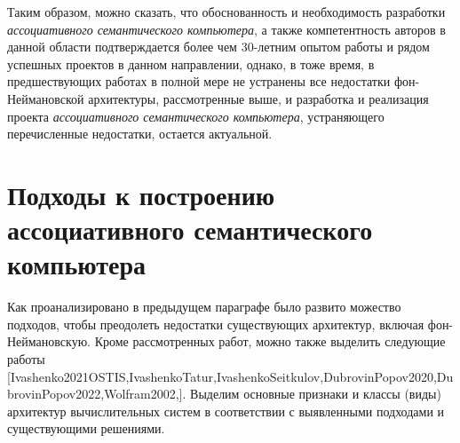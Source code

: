 Таким образом, можно сказать, что обоснованность и необходимость разработки \textit{ассоциативного семантического компьютера}, а также компетентность авторов в данной области подтверждается более чем 30-летним опытом работы и рядом успешных проектов в данном направлении, однако, в тоже время, в предшествующих работах в полной мере не устранены все недостатки фон-Неймановской архитектуры, рассмотренные выше, и разработка и реализация проекта \textit{ассоциативного семантического компьютера}, устраняющего перечисленные недостатки, остается актуальной.

\section{Подходы к построению ассоциативного семантического компьютера}
Как проанализировано в предыдущем параграфе было развито можество подходов, чтобы преодолеть недостатки существующих архитектур, включая фон-Неймановскую. Кроме рассмотренных работ, можно также выделить следующие работы [Ivashenko2021OSTIS,IvashenkoTatur,IvashenkoSeitkulov,DubrovinPopov2020,DubrovinPopov2022,Wolfram2002,].
Выделим основные признаки и классы (виды) архитектур вычислительных систем в соответствии с выявленными подходами и существующими решениями.
